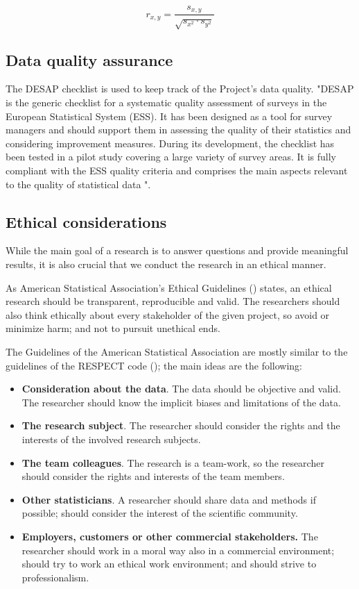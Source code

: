 \documentclass[12pt,a4paper,paper=a4,oneside,titlepage,pdftex]{scrartcl}
\begin{document}
\begin{equation}
r_{x,y} = \frac{s_{x,y}}{\sqrt{s_{x^2} \cdot s_{y^2}}}
\label{eq:correlation}
\end{equation}

\subsection{Data quality assurance}
The DESAP checklist is used to keep track of the Project's data quality. "DESAP  is  the  generic  checklist  for  a  systematic  quality  assessment  of  surveys  in  the  European Statistical  System  (ESS).  It  has  been  designed  as  a  tool  for  survey  managers  and  should  support them  in  assessing  the  quality  of  their  statistics  and  considering  improvement  measures.  During  its development, the checklist has been tested in a pilot study covering a large variety of survey areas. It is fully compliant with the ESS quality criteria and comprises the main aspects relevant to the quality of  statistical  data \citep{desap2019}".

\subsection{Ethical considerations} 
While the main goal of a research is to answer questions and provide meaningful results, it is also crucial that we conduct the research in an ethical manner. 

As American Statistical Association’s Ethical Guidelines (\citep{asa}) states, an ethical research should be transparent, reproducible and valid. The researchers should also think ethically about every stakeholder of the given project, so avoid or minimize harm; and not to pursuit unethical ends. 

The Guidelines of the American Statistical Association are mostly similar to the guidelines of the RESPECT code (\citep{respect}); the main ideas are the following:

\begin{itemize}
	\item \textbf{Consideration about the data}. The data should be objective and valid. The researcher should know the implicit biases and limitations of the data.
	\item \textbf{The research subject}. The researcher should consider the rights and the interests of the involved research subjects.
	\item \textbf{The team colleagues}. The research is a team-work, so the researcher should consider the rights and interests of the team members.
	\item \textbf{Other statisticians}. A researcher should share data and methods if possible; should consider the interest of the scientific community.
	\item \textbf{Employers, customers or other commercial stakeholders.} The researcher should work in a moral way also in a commercial environment; should try to work an ethical work environment; and should strive to professionalism.
\end{itemize}
\end{document}

